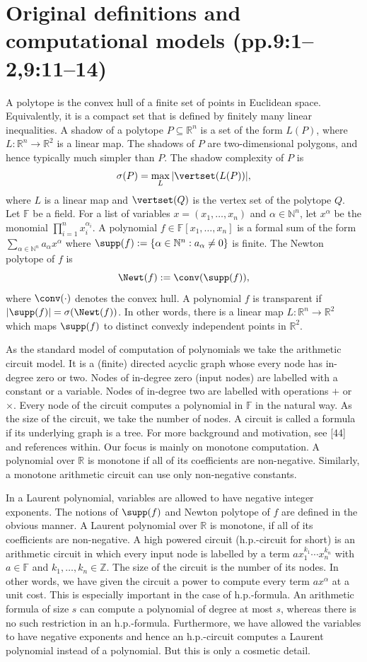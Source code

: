 \section*{Original definitions and computational models (pp.9:1--2,9:11--14)}
A polytope is the convex hull of a finite set of points in Euclidean space. Equivalently, it is a compact set that is defined by finitely many linear inequalities.
A shadow of a polytope $P\subseteq\mathbb R^n$ is a set of the form $L(P)$, where $L:\mathbb R^n\to\mathbb R^2$ is a linear map. The shadows of $P$ are two-dimensional polygons, and hence typically much simpler than $P$. The shadow complexity of $P$ is
\[
\sigma(P)=\max_L |\vertset(L(P))|,
\]
where $L$ is a linear map and $\vertset(Q)$ is the vertex set of the polytope $Q$.
Let $\mathbb F$ be a field. For a list of variables $x=(x_1,\ldots,x_n)$ and $\alpha\in\mathbb N^n$, let $x^\alpha$ be the monomial $\prod_{i=1}^n x_i^{\alpha_i}$. A polynomial $f\in\mathbb F[x_1,\ldots,x_n]$ is a formal sum of the form $\sum_{\alpha\in\mathbb N^n}a_\alpha x^\alpha$ where $\supp(f):=\{\alpha\in\mathbb N^n:a_\alpha\ne0\}$ is finite. The Newton polytope of $f$ is
\[\Newt(f):=\conv(\supp(f)),\]
where $\conv(\cdot)$ denotes the convex hull.
A polynomial $f$ is transparent if $|\supp(f)|=\sigma(\Newt(f))$. In other words, there is a linear map $L:\mathbb R^n\to\mathbb R^2$ which maps $\supp(f)$ to distinct convexly independent points in $\mathbb R^2$.

As the standard model of computation of polynomials we take the arithmetic circuit model. It is a (finite) directed acyclic graph whose every node has in-degree zero or two. Nodes of in-degree zero (input nodes) are labelled with a constant or a variable. Nodes of in-degree two are labelled with operations $+$ or $\times$. Every node of the circuit computes a polynomial in $\mathbb F$ in the natural way. As the size of the circuit, we take the number of nodes. A circuit is called a formula if its underlying graph is a tree. For more background and motivation, see [44] and references within.
Our focus is mainly on monotone computation. A polynomial over $\mathbb R$ is monotone if all of its coefficients are non-negative. Similarly, a monotone arithmetic circuit can use only non-negative constants.

In a Laurent polynomial, variables are allowed to have negative integer exponents. The notions of $\supp(f)$ and Newton polytope of $f$ are defined in the obvious manner. A Laurent polynomial over $\mathbb R$ is monotone, if all of its coefficients are non-negative.
A high powered circuit (h.p.-circuit for short) is an arithmetic circuit in which every input node is labelled by a term $ax_1^{k_1}\cdots x_n^{k_n}$ with $a\in\mathbb F$ and $k_1,\ldots,k_n\in\mathbb Z$. The size of the circuit is the number of its nodes.
In other words, we have given the circuit a power to compute every term $ax^\alpha$ at a unit cost. This is especially important in the case of h.p.-formula. An arithmetic formula of size $s$ can compute a polynomial of degree at most $s$, whereas there is no such restriction in an h.p.-formula. Furthermore, we have allowed the variables to have negative exponents and hence an h.p.-circuit computes a Laurent polynomial instead of a polynomial. But this is only a cosmetic detail.


